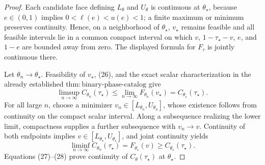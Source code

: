 \documentclass{article}
\begin{document}
\begin{proof}
Each candidate face defining \(L_\theta\) and \(U_\theta\) is continuous at \(\theta_\star\), because \(e\in(0,1)\) implies \(0<\ell(e)<u(e)<1\); a finite maximum or minimum preserves continuity.  Hence, on a neighborhood of \(\theta_\star\), \(v_\star\) remains feasible and all feasible intervals lie in a common compact interval on which \(v\), \(1-\tau_\star-v\), \(e\), and \(1-e\) are bounded away from zero.  The displayed formula for \(F_\tau\) is jointly continuous there.

Let \(\theta_n\to\theta_\star\).  Feasibility of \(v_\star\), (26), and the exact scalar characterization in the already established \(\mathrm{thm{:}binary\mbox{-}phase\mbox{-}catalog}\) give
\[
\limsup_{n\to\infty}C_{\theta_n}(\tau_\star)
\leq\lim_{n\to\infty}F_{\theta_n}(v_\star)
=C_{\theta_\star}(\tau_\star).
\tag{27}
\]
For all large \(n\), choose a minimizer \(v_n\in[L_{\theta_n},U_{\theta_n}]\), whose existence follows from continuity on the compact scalar interval.  Along a subsequence realizing the lower limit, compactness supplies a further subsequence with \(v_n\to v\).  Continuity of both endpoints implies \(v\in[L_{\theta_\star},U_{\theta_\star}]\), and joint continuity yields
\[
\liminf_{n\to\infty}C_{\theta_n}(\tau_\star)
=F_{\theta_\star}(v)
\geq C_{\theta_\star}(\tau_\star).
\tag{28}
\]
Equations (27)--(28) prove continuity of \(C_\theta(\tau_\star)\) at \(\theta_\star\).


\end{proof}
\end{document}
